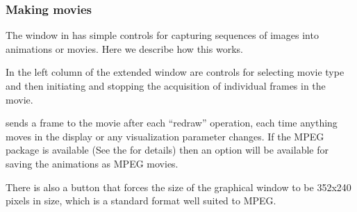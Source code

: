 \subsubsection{Making movies}
\label{sec:view-movies} 

The \viewer{} window in \SR{} has simple controls for capturing sequences
of images into animations or movies.  Here we describe how this works.

In the left column of the extended \viewer{} window are controls for
selecting movie type and then initiating and stopping the acquisition of
individual frames in the movie.

\SR{} sends a frame to the movie after each ``redraw'' operation, \ie{}
each time anything moves in the display or any visualization parameter
changes.  If the MPEG package is available (See the
 for
details) then an option will be available for saving the animations as MPEG
movies.

There is also a button that forces the size of the graphical window to be
352x240 pixels in size, which is a standard format well suited to MPEG.


